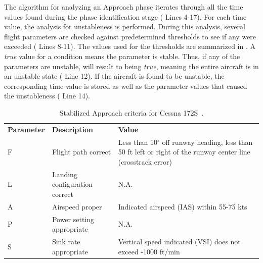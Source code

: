         The algorithm for analyzing an Approach phase iterates through all the time values found during the phase identification stage ( Lines 4-17).  For each time value, the analysis for unstableness is performed.  During this analysis, several flight parameters are checked against predetermined thresholds to see if any were exceeded ( Lines 8-11).  The values used for the thresholds are summarized in .  A \textit{true} value for a condition means the parameter is stable.  Thus, if any of the parameters are unstable,  will result to being \textit{true}, meaning the entire aircraft is in an unstable state ( Line 12).  If the aircraft is found to be unstable, the corresponding time value is stored as well as the parameter values that caused the unstableness ( Line 14).
        
        \begin{table}
            \caption{\small{Stabilized Approach criteria for Cessna 172S~\cite{und_flight_manual}.}} \label{tab:approach_thresholds}
            \vspace{3pt}
            \centering
            \begin{tabular}{@{} >{\centering\arraybackslash} m{.15\linewidth} >{\raggedright\arraybackslash} m{.3\linewidth} m{.42\linewidth} @{}}
                \hline\noalign{\smallskip}
                \bfseries Parameter & \bfseries Description & \bfseries Value \\
                \noalign{\smallskip}
                \hline
                \noalign{\smallskip}
                F & Flight path correct & Less than 10$^\circ$ off runway heading, less than 50 ft left or right of the runway center line (crosstrack error) \\ \hline
                L & Landing configuration correct & N.A. \\ \hline
                A & Airspeed proper & Indicated airspeed (IAS) within 55-75 kts \\ \hline
                P & Power setting appropriate & N.A. \\ \hline
                S & Sink rate appropriate & Vertical speed indicated (VSI) does not exceed -1000 ft/min \\ \hline
            \end{tabular}
        \end{table}
        
